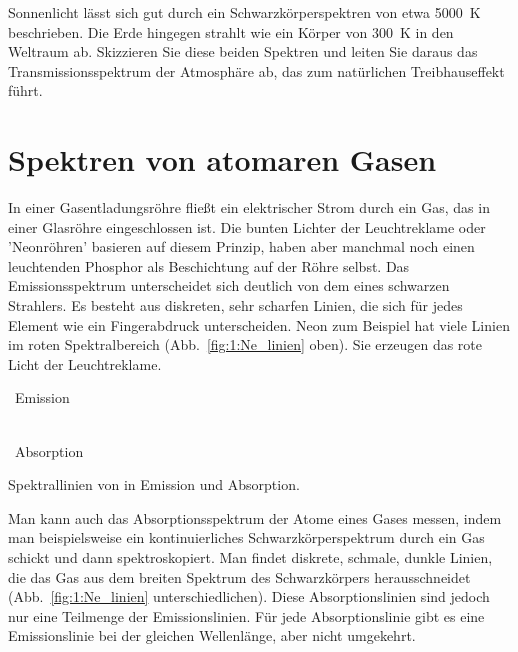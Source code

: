 \begin{questions}  
\item Sonnenlicht lässt sich gut durch ein Schwarzkörperspektren von etwa 5000~K beschrieben. Die Erde hingegen strahlt wie ein Körper von 300~K in den Weltraum ab. Skizzieren Sie diese beiden Spektren und leiten Sie daraus das Transmissionsspektrum der Atmosphäre ab, das zum natürlichen Treibhauseffekt führt.
\end{questions}


\section{Spektren von atomaren Gasen}

In einer Gasentladungsröhre fließt ein elektrischer Strom durch ein Gas, das in einer Glasröhre eingeschlossen ist. Die bunten Lichter der Leuchtreklame oder 'Neonröhren' basieren auf diesem Prinzip, haben aber manchmal noch einen leuchtenden Phosphor als Beschichtung auf der Röhre selbst. Das Emissionsspektrum unterscheidet sich deutlich von dem eines schwarzen Strahlers. Es besteht aus diskreten, sehr scharfen Linien, die sich für jedes Element wie ein Fingerabdruck unterscheiden. Neon zum Beispiel hat viele Linien im roten Spektralbereich (Abb.~\ref{fig:1:Ne_linien} oben). Sie erzeugen das rote Licht der Leuchtreklame.

\begin{marginfigure}
    \ Emission

    \pgfspectra[width=\textwidth ,element=Ne , Imin=0.2]

    \ \\

   \  Absorption

   \pgfspectra[width=\textwidth ,absorption, lines={585.2  , 692.9}]

\caption{Spektrallinien von  in Emission und Absorption.}
\label{fig:1:Ne_linien}
\end{marginfigure}

Man kann auch das Absorptionsspektrum der Atome eines Gases messen, indem man beispielsweise ein kontinuierliches Schwarzkörperspektrum durch ein Gas schickt und dann spektroskopiert. Man findet diskrete, schmale, dunkle Linien, die das Gas aus dem breiten Spektrum des Schwarzkörpers herausschneidet  (Abb.~\ref{fig:1:Ne_linien} unterschiedlichen). Diese Absorptionslinien sind jedoch nur eine Teilmenge der Emissionslinien. Für jede Absorptionslinie gibt es eine Emissionslinie bei der gleichen Wellenlänge, aber nicht umgekehrt.


